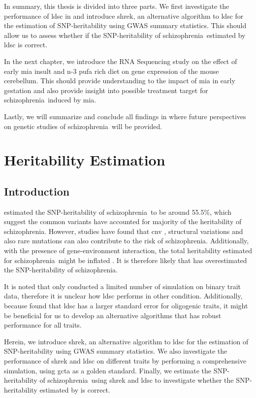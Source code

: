 \documentclass[12pt]{scrbook}
\newcommand*{\scz}{schizophrenia}
\begin{document}
In summary, this thesis is divided into three parts. 
We first investigate the performance of \gls{ldsc} in  and introduce \gls{shrek}, an alternative algorithm to \gls{ldsc} for the estimation of \gls{SNP}-heritability using \gls{GWAS} summary statistics. 
This should allow us to assess whether if the \gls{SNP}-heritability of \scz\ estimated by \gls{ldsc} is correct.

In the next chapter, we introduce the RNA Sequencing study on the effect of early \gls{mia} insult and n-3 \gls{pufa} rich diet on gene expression of the mouse cerebellum.
This should provide understanding to the impact of \gls{mia} in early gestation and also provide insight into possible treatment target for \scz\ induced by \gls{mia}.

Lastly, we will summarize and conclude all findings in  where future perspectives on genetic studies of \scz\ will be provided.

\chapter{Heritability Estimation}
\label{heritabilityChapter}
\section{Introduction}
\citet{Bulik-Sullivan2015} estimated the \gls{SNP}-heritability of \scz\ to be around 55.5\%, which suggest the common variants have accounted for majority of the heritability of \scz.
However, studies have found that \gls{cnv} \citep{Szatkiewicz2014}, structural variations \citep{Walsh2008} and also rare mutations \citep{purcell2014polygenic} can also contribute to the risk of \scz.
Additionally, with the presence of gene-environment interaction, the total heritability estimated for \scz\ might be inflated \citet{zuk2012mystery}. 
It is therefore likely that \citet{Bulik-Sullivan2015} has overestimated the \gls{SNP}-heritability of \scz.

It is noted that \citet{Bulik-Sullivan2015} only conducted a limited number of simulation on binary trait data, therefore it is unclear how \gls{ldsc} performs in other condition.
Additionally, because \citet{Bulik-Sullivan2015} found that \gls{ldsc} has a larger standard error for oligogenic traits, it might be beneficial for us to develop an alternative algorithms that has robust performance for all traits. 

Herein, we introduce \gls{shrek}, an alternative algorithm to \gls{ldsc} for the estimation of \gls{SNP}-heritability using \gls{GWAS} summary statistics.
We also investigate the performance of \gls{shrek} and \gls{ldsc} on different traits by performing a comprehensive simulation, using \gls{gcta} as a golden standard. 
Finally, we estimate the \gls{SNP}-heritability of \scz\ using \gls{shrek} and \gls{ldsc} to investigate whether the \gls{SNP}-heritability estimated by \citet{Bulik-Sullivan2015} is correct.
\end{document}
